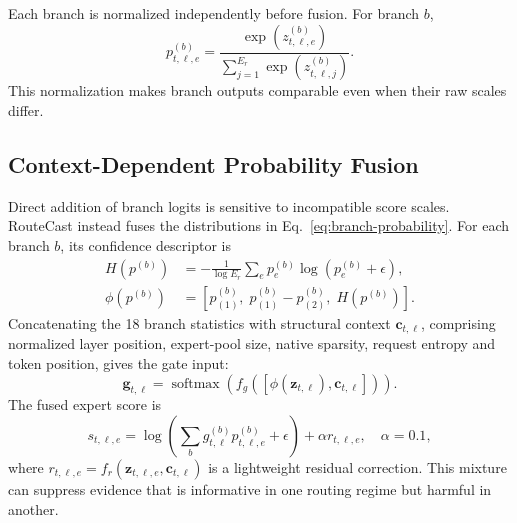 \documentclass[conference]{IEEEtran}
\begin{document}
Each branch is normalized independently before fusion. For branch $b$,
\begin{equation}
p^{(b)}_{t,\ell,e}=
\frac{\exp(z^{(b)}_{t,\ell,e})}
{\sum_{j=1}^{E_r}\exp(z^{(b)}_{t,\ell,j})}.
\label{eq:branch-probability}
\end{equation}
This normalization makes branch outputs comparable even when their raw scales differ.

\subsection{Context-Dependent Probability Fusion}
Direct addition of branch logits is sensitive to incompatible score scales. RouteCast instead fuses the distributions in Eq.~\eqref{eq:branch-probability}. For each branch $b$, its confidence descriptor is
\begin{align}
H(p^{(b)})&=-\frac{1}{\log E_r}
\sum_e p^{(b)}_e\log(p^{(b)}_e+\epsilon),\\
\phi(p^{(b)})&=
\left[p^{(b)}_{(1)},\;p^{(b)}_{(1)}-p^{(b)}_{(2)},\;H(p^{(b)})\right].
\label{eq:branch-descriptor}
\end{align}
Concatenating the 18 branch statistics with structural context $\mathbf{c}_{t,\ell}$, comprising normalized layer position, expert-pool size, native sparsity, request entropy and token position, gives the gate input:
\begin{equation}
\mathbf{g}_{t,\ell}=\operatorname{softmax}
\!\left(f_g([\phi(\mathbf{z}_{t,\ell}),\mathbf{c}_{t,\ell}])\right).
\end{equation}
The fused expert score is
\begin{equation}
s_{t,\ell,e}=\log\!\left(\sum_b g^{(b)}_{t,\ell}
p^{(b)}_{t,\ell,e}+\epsilon\right)+\alpha r_{t,\ell,e},
\quad \alpha=0.1,
\label{eq:fusion}
\end{equation}
where $r_{t,\ell,e}=f_r(\mathbf{z}_{t,\ell,e},\mathbf{c}_{t,\ell})$ is a lightweight residual correction. This mixture can suppress evidence that is informative in one routing regime but harmful in another.
\end{document}
